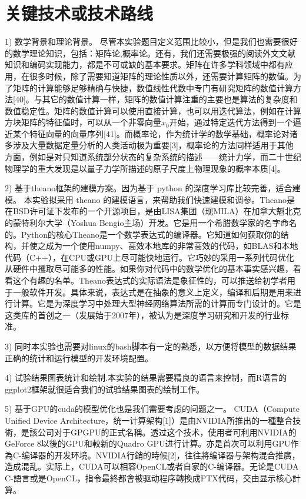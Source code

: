 \documentclass[12pt,a4paper]{article}
\begin{document}
\section{关键技术或技术路线}

1) 数学背景和理论背景。 尽管本实验题目定义范围比较小，但是我们也需要很好的数学理论知识，包括：矩阵论,概率论。还有，我们还需要极强的阅读外文文献知识和编码实现能力，都是不可或缺的基本要求。矩阵在许多学科领域中都有应用，在很多时候，除了需要知道矩阵的理论性质以外，还需要计算矩阵的数值。为了矩阵的计算能够足够精确与快捷，数值线性代数中专门有研究矩阵的数值计算方法[40]。与其它的数值计算一样，矩阵的数值计算注重的主要也是算法的复杂度和数值稳定性。矩阵的数值计算可以使用直接计算，也可以用迭代算法，例如在计算方块矩阵的特征值时，可以从一个非零向量$x_0$开始，通过特定迭代方法得到一个逼近某个特征向量的向量序列[41]。而概率论，作为统计学的数学基础，概率论对诸多涉及大量数据定量分析的人类活动极为重要[3]，概率论的方法同样适用于其他方面，例如是对只知道系统部分状态的复杂系统的描述——统计力学，而二十世纪物理学的重大发现是以量子力学所描述的原子尺度上物理现象的概率本质[4]。

2) 基于theano框架的建模方案。因为基于 python 的深度学习库比较完善，适合建模。 本实验拟采用 theano 的建模语言，来帮助我们快速建模和调参。Theano是在BSD许可证下发布的一个开源项目，是由LISA集团（现MILA）在加拿大魁北克的蒙特利尔大学（Yoshua Bengio主场）开发。它是用一个希腊数学家的名字命名的。Python的核心Theano是一个数学表达式的编译器。它知道如何获取你的结构，并使之成为一个使用numpy、高效本地库的非常高效的代码，如BLAS和本地代码（C++），在CPU或GPU上尽可能快地运行。它巧妙的采用一系列代码优化从硬件中攫取尽可能多的性能。如果你对代码中的数学优化的基本事实感兴趣，看看这个有趣的名单。Theano表达式的实际语法是象征性的，可以推送给初学者用于一般软件开发。具体来说，表达式是在抽象的意义上定义，编译和后期是用来进行计算。它是为深度学习中处理大型神经网络算法所需的计算而专门设计的。它是这类库的首创之一（发展始于2007年），被认为是深度学习研究和开发的行业标准。

3) 同时本实验也需要对linux的bash脚本有一定的熟悉，以方便将模型的数据结果正确的统计和运行模型的开发环境配置。

4) 试验结果图表统计和绘制.本实验的结果需要精良的语言来控制，而R语言的ggplot2框架就很适合我们的试验结果图表的绘制工作。

5) 基于GPU的cuda的模型优化也是我们需要考虑的问题之一。 CUDA（Compute Unified Device Architecture，统一计算架构[1]）是由NVIDIA所推出的一種整合技術，是該公司对于GPGPU的正式名稱。透过这个技术，使用者可利用NVIDIA的GeForce 8以後的GPU和較新的Quadro GPU进行计算。亦是首次可以利用GPU作為C-编译器的开发环境。NVIDIA行銷的時候[2]，往往將编译器与架构混合推廣，造成混乱。实际上，CUDA可以相容OpenCL或者自家的C-编译器。无论是CUDA C-語言或是OpenCL，指令最終都會被驱动程序轉換成PTX代码，交由显示核心計算。
\end{document}
